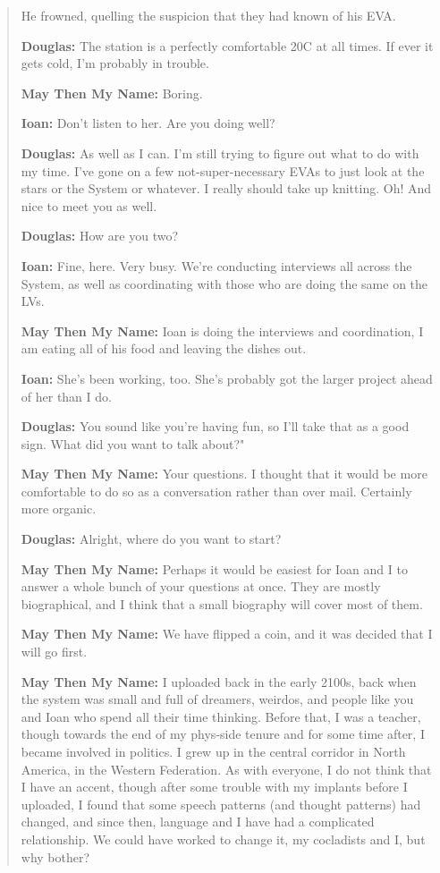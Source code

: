 \begin{quote}
He frowned, quelling the suspicion that they had known of his EVA.

\textbf{Douglas:} The station is a perfectly comfortable 20C at all times. If ever it gets cold, I'm probably in trouble.

\textbf{May Then My Name:} Boring.

\textbf{Ioan:} Don't listen to her. Are you doing well?

\textbf{Douglas:} As well as I can. I'm still trying to figure out what to do with my time. I've gone on a few not-super-necessary EVAs to just look at the stars or the System or whatever. I really should take up knitting. Oh! And nice to meet you as well.

\textbf{Douglas:} How are you two?

\textbf{Ioan:} Fine, here. Very busy. We're conducting interviews all across the System, as well as coordinating with those who are doing the same on the LVs.

\textbf{May Then My Name:} Ioan is doing the interviews and coordination, I am eating all of his food and leaving the dishes out.

\textbf{Ioan:} She's been working, too. She's probably got the larger project ahead of her than I do.

\textbf{Douglas:} You sound like you're having fun, so I'll take that as a good sign. What did you want to talk about?"

\textbf{May Then My Name:} Your questions. I thought that it would be more comfortable to do so as a conversation rather than over mail. Certainly more organic.

\textbf{Douglas:} Alright, where do you want to start?

\textbf{May Then My Name:} Perhaps it would be easiest for Ioan and I to answer a whole bunch of your questions at once. They are mostly biographical, and I think that a small biography will cover most of them.

\textbf{May Then My Name:} We have flipped a coin, and it was decided that I will go first.

\textbf{May Then My Name:} I uploaded back in the early 2100s, back when the system was small and full of dreamers, weirdos, and people like you and Ioan who spend all their time thinking. Before that, I was a teacher, though towards the end of my phys-side tenure and for some time after, I became involved in politics. I grew up in the central corridor in North America, in the Western Federation. As with everyone, I do not think that I have an accent, though after some trouble with my implants before I uploaded, I found that some speech patterns (and thought patterns) had changed, and since then, language and I have had a complicated relationship. We could have worked to change it, my cocladists and I, but why bother?


\end{quote}
